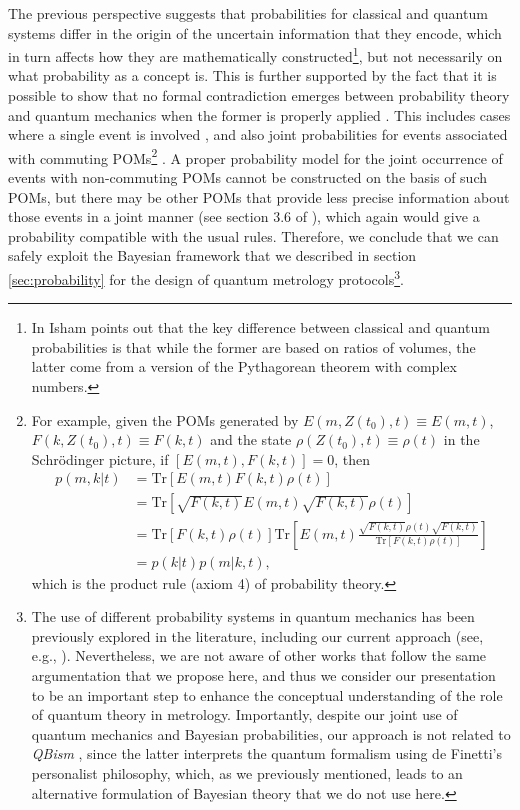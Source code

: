 The previous perspective suggests that probabilities for classical and quantum systems differ in the origin of the uncertain information that they encode, which in turn affects how they are mathematically constructed\footnote{In \cite{isham1995} Isham points out that the key difference between classical and quantum probabilities is that while the former are based on ratios of volumes, the latter come from a version of the Pythagorean theorem with complex numbers.}, but not necessarily on what probability as a concept is. This is further supported by the fact that it is possible to show that no formal contradiction emerges between probability theory and quantum mechanics when the former is properly applied \cite{ballentine1986}. This includes cases where a single event is involved \cite{ballentine1998, ballentine1986}, and also joint probabilities for events associated with commuting POMs\footnote{For example, given the POMs generated by $E(m, Z(t_0),t) \equiv E(m,t)$, $F(k, Z(t_0),t) \equiv F(k,t)$ and the state $\rho(Z(t_0),t) \equiv \rho(t)$ in the Schr\"{o}dinger picture, if $[E(m,t), F(k,t)] = 0$, then 
\begin{align}
p(m,k|t) &= \mathrm{Tr}\left[E(m,t)F(k,t)\rho(t)\right]
\nonumber \\
&= \mathrm{Tr}\left[\sqrt{F(k,t)}E(m,t)\sqrt{F(k,t)}\rho(t)\right]
\nonumber \\
&= \mathrm{Tr}\left[F(k,t)\rho(t)\right]\mathrm{Tr}\left[E(m,t)\frac{\sqrt{F(k,t)}\rho(t)\sqrt{F(k,t)}}{\mathrm{Tr}\left[F(k,t)\rho(t)\right]}\right]
\nonumber \\
&= p(k|t) p(m|k, t), 
\nonumber
\end{align}
which is the product rule (axiom 4) of probability theory.} \cite{breuer2002, ballentine1998}. A proper probability model for the joint occurrence of events with non-commuting POMs cannot be constructed on the basis of such POMs, but there may be other POMs that provide less precise information about those events in a joint manner (see section 3.6 of \cite{holevo2011}), which again would give a probability compatible with the usual rules. Therefore, we conclude that we can safely exploit the Bayesian framework that we described in section \ref{sec:probability} for the design of quantum metrology protocols\footnote{The use of different probability systems in quantum mechanics has been previously explored in the literature, including our current approach (see, e.g., \cite{ballentine1986, ballentine1998, ballentine2016}). Nevertheless, we are not aware of other works that follow the same argumentation that we propose here, and thus we consider our presentation to be an important step to enhance the conceptual understanding of the role of quantum theory in metrology. Importantly, despite our joint use of quantum mechanics and Bayesian probabilities, our approach is not related to \emph{QBism} \cite{fuchs2017}, since the latter interprets the quantum formalism using de Finetti's personalist philosophy, which, as we previously mentioned, leads to an alternative formulation of Bayesian theory that we do not use here.}.

